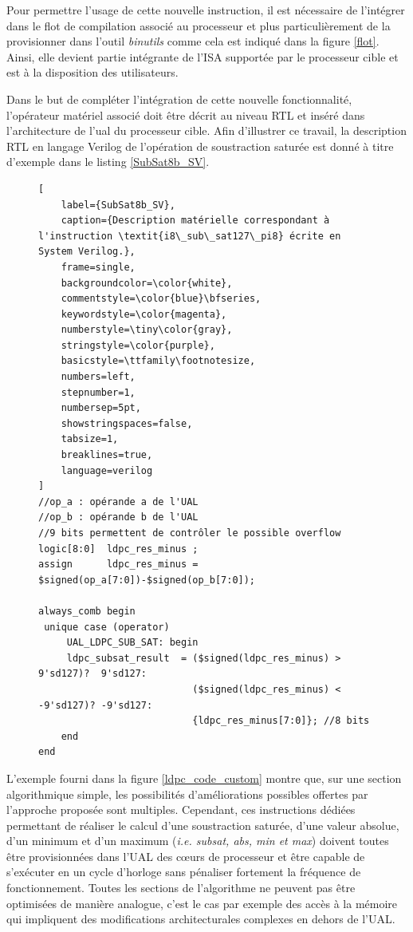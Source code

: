 \documentclass[../main.tex]{subfiles}
\begin{document}
Pour permettre l'usage de cette nouvelle instruction, il est nécessaire de l'intégrer dans le flot de compilation associé au processeur et plus particulièrement de la provisionner dans l'outil \textit{binutils} comme cela est indiqué dans la figure \ref{flot}. Ainsi, elle devient partie intégrante de l'ISA supportée par le processeur cible et est à la disposition des utilisateurs.

Dans le but de compléter l'intégration de cette nouvelle fonctionnalité, l'opérateur matériel associé doit être décrit au niveau RTL et inséré dans l'architecture de l'\acrshort{ual} du processeur cible. Afin d'illustrer ce travail, la description RTL en langage Verilog de l'opération de soustraction saturée est donné à titre d'exemple dans le listing \ref{SubSat8b_SV}.
    
\begin{figure}[!tb]
\begin{lstlisting}[
    label={SubSat8b_SV},      
    caption={Description matérielle correspondant à l'instruction \textit{i8\_sub\_sat127\_pi8} écrite en System Verilog.},
    frame=single,
    backgroundcolor=\color{white},  
    commentstyle=\color{blue}\bfseries,
    keywordstyle=\color{magenta},
    numberstyle=\tiny\color{gray},
    stringstyle=\color{purple},
    basicstyle=\ttfamily\footnotesize,
    numbers=left,
    stepnumber=1,
    numbersep=5pt,                 
    showstringspaces=false,
    tabsize=1,
    breaklines=true,
    language=verilog
]
//op_a : opérande a de l'UAL 
//op_b : opérande b de l'UAL
//9 bits permettent de contrôler le possible overflow
logic[8:0]  ldpc_res_minus ; 
assign      ldpc_res_minus = $signed(op_a[7:0])-$signed(op_b[7:0]); 

always_comb begin
 unique case (operator)
     UAL_LDPC_SUB_SAT: begin 
     ldpc_subsat_result  = ($signed(ldpc_res_minus) >  9'sd127)?  9'sd127:
                           ($signed(ldpc_res_minus) < -9'sd127)? -9'sd127:
                           {ldpc_res_minus[7:0]}; //8 bits
    end
end
\end{lstlisting}
\end{figure}

L'exemple fourni dans la figure \ref{ldpc_code_custom} montre que, sur une section algorithmique simple, les possibilités d'améliorations possibles offertes par l'approche proposée sont multiples.
Cependant, ces instructions dédiées permettant de réaliser le calcul d'une soustraction saturée, d'une valeur absolue, d'un minimum et d'un maximum (\textit{i.e. subsat, abs, min et max}) doivent toutes être provisionnées dans l'UAL des cœurs de processeur et être capable de s'exécuter en un cycle d'horloge sans pénaliser fortement la fréquence de fonctionnement. Toutes les sections de l'algorithme ne peuvent pas être optimisées de manière analogue, c'est le cas par exemple des accès à la mémoire qui impliquent des modifications architecturales complexes en dehors de l'UAL. 
\end{document}
